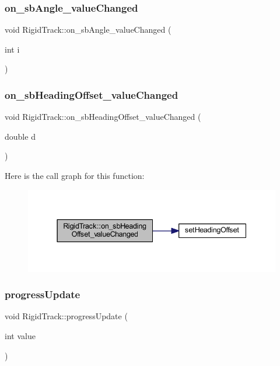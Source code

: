 \subsubsection{on\+\_\+sb\+Angle\+\_\+value\+Changed}
{\footnotesize\ttfamily void Rigid\+Track\+::on\+\_\+sb\+Angle\+\_\+value\+Changed (\begin{DoxyParamCaption}\item[{int}]{i }\end{DoxyParamCaption})\hspace{0.3cm}{\ttfamily [slot]}}

\mbox{\label{class_rigid_track_a72e338d6bf93d0efa3bc503f7ca736c5}} 
\subsubsection{on\+\_\+sb\+Heading\+Offset\+\_\+value\+Changed}
{\footnotesize\ttfamily void Rigid\+Track\+::on\+\_\+sb\+Heading\+Offset\+\_\+value\+Changed (\begin{DoxyParamCaption}\item[{double}]{d }\end{DoxyParamCaption})\hspace{0.3cm}{\ttfamily [slot]}}

Here is the call graph for this function\+:\nopagebreak
\begin{figure}[H]
\begin{center}
\leavevmode
\includegraphics[width=337pt]{class_rigid_track_a72e338d6bf93d0efa3bc503f7ca736c5_cgraph}
\end{center}
\end{figure}
\mbox{\label{class_rigid_track_a9d229d23fdf40b988a1743accb695ea8}} 
\subsubsection{progress\+Update}
{\footnotesize\ttfamily void Rigid\+Track\+::progress\+Update (\begin{DoxyParamCaption}\item[{int}]{value }\end{DoxyParamCaption})\hspace{0.3cm}{\ttfamily [slot]}}

